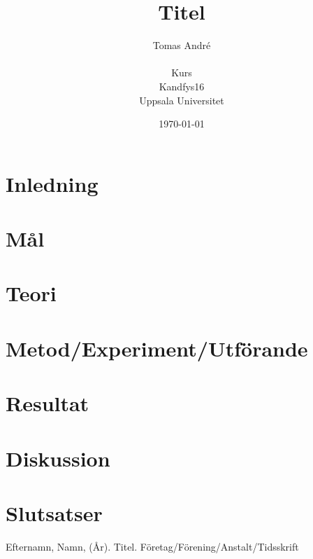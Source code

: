 \documentclass[11pt]{article}
\title{\textbf{Titel}}
\author{Tomas André\\\\Kurs\\Kandfys16\\ Uppsala Universitet}
\date{\today}
\begin{document}
\maketitle 


\newpage
\begin{otherlanguage}{english}
\begin{abstract}
\end{abstract}
\end{otherlanguage}
\newpage
\tableofcontents
\newpage

\section{Inledning}

\section{Mål}

\section{Teori}

\section{Metod/Experiment/Utförande}

\section{Resultat}

\section{Diskussion}

\section{Slutsatser}

\begin{thebibliography}{1}
 Efternamn, Namn, (År). Titel. Företag/Förening/Anstalt/Tidsskrift
\end{thebibliography} 
\newpage
\appendix
\end{document}
